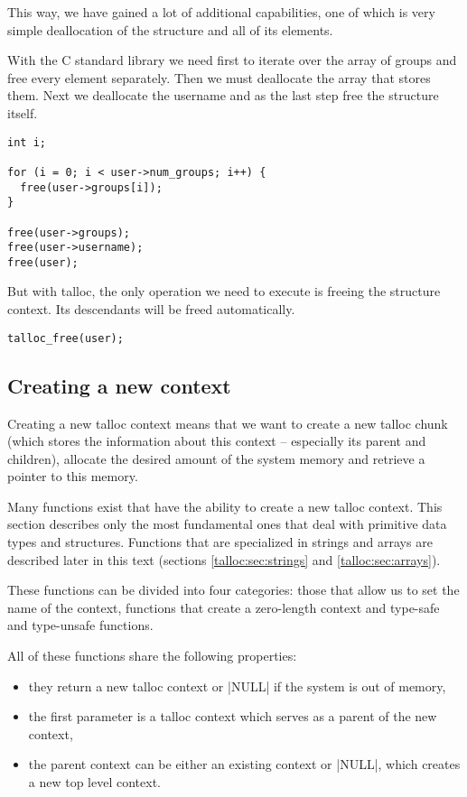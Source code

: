 \noindent
This way, we have gained a lot of additional capabilities, one of which is
very simple deallocation of the structure and all of its elements.

With the C standard library we need first to iterate over the array of groups
and free every element separately. Then we must deallocate the array that stores
them. Next we deallocate the username and as the last step free the structure
itself.

\begin{lstlisting}[caption={Freeing struct user -- C standard library},
                   label={lst:free-struct-user-c}]
int i;

for (i = 0; i < user->num_groups; i++) {
  free(user->groups[i]);
}

free(user->groups);
free(user->username);
free(user);
\end{lstlisting}

\noindent
But with talloc, the only operation we need to execute is freeing the
structure context. Its descendants will be freed automatically.

\begin{lstlisting}[caption={Freeing struct user -- talloc library},
                   label={lst:free-struct-user-talloc}]
talloc_free(user);
\end{lstlisting}

\subsection{Creating a new context}
\label{talloc:subsec:new-context}

Creating a new talloc context means that we want to create a new talloc chunk
(which stores the information about this context -- especially its parent and
children), allocate the desired amount of the system memory and retrieve a
pointer to this memory.

Many functions exist that have the ability to create a new talloc context. This
section describes only the most fundamental ones that deal with primitive data
types and structures. Functions that are specialized in strings and arrays are
described later in this text (sections \ref{talloc:sec:strings} and
\ref{talloc:sec:arrays}).

These functions can be divided into four categories: those that allow us to set
the name of the context, functions that create a zero-length context and
type-safe and type-unsafe functions.

All of these functions share the following properties:
\begin{itemize}
  \item they return a new talloc context or |NULL| if the system is out of
  memory,
  \item the first parameter is a talloc context which serves as a parent of
  the new context,
  \item the parent context can be either an existing context or |NULL|, which
  creates a new top level context.
\end{itemize}

